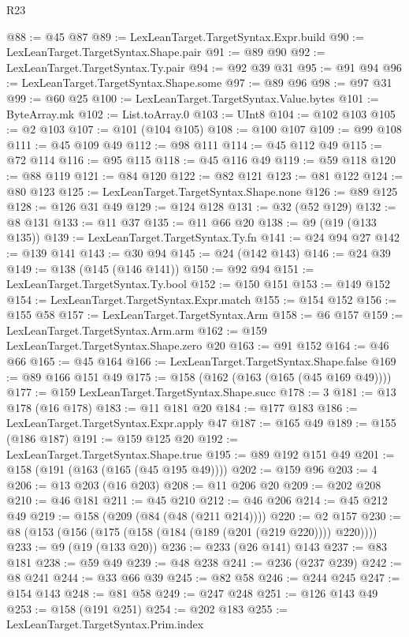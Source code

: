 \begin{lexlean}{R23}
\begin{coremodule}
@88 := @45 @87
@89 := LexLeanTarget.TargetSyntax.Expr.build
@90 := LexLeanTarget.TargetSyntax.Shape.pair
@91 := @89 @90
@92 := LexLeanTarget.TargetSyntax.Ty.pair
@94 := @92 @39 @31
@95 := @91 @94
@96 := LexLeanTarget.TargetSyntax.Shape.some
@97 := @89 @96
@98 := @97 @31
@99 := @60 @25
@100 := LexLeanTarget.TargetSyntax.Value.bytes
@101 := ByteArray.mk
@102 := List.toArray.{0}
@103 := UInt8
@104 := @102 @103
@105 := @2 @103
@107 := @101 (@104 @105)
@108 := @100 @107
@109 := @99 @108
@111 := @45 @109 @49
@112 := @98 @111
@114 := @45 @112 @49
@115 := @72 @114
@116 := @95 @115
@118 := @45 @116 @49
@119 := @59 @118
@120 := @88 @119
@121 := @84 @120
@122 := @82 @121
@123 := @81 @122
@124 := @80 @123
@125 := LexLeanTarget.TargetSyntax.Shape.none
@126 := @89 @125
@128 := @126 @31 @49
@129 := @124 @128
@131 := @32 (@52 @129)
@132 := @8 @131
@133 := @11 @37
@135 := @11 @66 @20
@138 := @9 (@19 (@133 @135))
@139 := LexLeanTarget.TargetSyntax.Ty.fn
@141 := @24 @94 @27
@142 := @139 @141
@143 := @30 @94
@145 := @24 (@142 @143)
@146 := @24 @39
@149 := @138 (@145 (@146 @141))
@150 := @92 @94
@151 := LexLeanTarget.TargetSyntax.Ty.bool
@152 := @150 @151
@153 := @149 @152
@154 := LexLeanTarget.TargetSyntax.Expr.match
@155 := @154 @152
@156 := @155 @58
@157 := LexLeanTarget.TargetSyntax.Arm
@158 := @6 @157
@159 := LexLeanTarget.TargetSyntax.Arm.arm
@162 := @159 LexLeanTarget.TargetSyntax.Shape.zero @20
@163 := @91 @152
@164 := @46 @66
@165 := @45 @164
@166 := LexLeanTarget.TargetSyntax.Shape.false
@169 := @89 @166 @151 @49
@175 := @158 (@162 (@163 (@165 (@45 @169 @49))))
@177 := @159 LexLeanTarget.TargetSyntax.Shape.succ
@178 := 3
@181 := @13 @178 (@16 @178)
@183 := @11 @181 @20
@184 := @177 @183
@186 := LexLeanTarget.TargetSyntax.Expr.apply @47
@187 := @165 @49
@189 := @155 (@186 @187)
@191 := @159 @125 @20
@192 := LexLeanTarget.TargetSyntax.Shape.true
@195 := @89 @192 @151 @49
@201 := @158 (@191 (@163 (@165 (@45 @195 @49))))
@202 := @159 @96
@203 := 4
@206 := @13 @203 (@16 @203)
@208 := @11 @206 @20
@209 := @202 @208
@210 := @46 @181
@211 := @45 @210
@212 := @46 @206
@214 := @45 @212 @49
@219 := @158 (@209 (@84 (@48 (@211 @214))))
@220 := @2 @157
@230 := @8 (@153 (@156 (@175 (@158 (@184 (@189 (@201 (@219 @220)))) @220))))
@233 := @9 (@19 (@133 @20))
@236 := @233 (@26 @141) @143
@237 := @83 @181
@238 := @59 @49
@239 := @48 @238
@241 := @236 (@237 @239)
@242 := @8 @241
@244 := @33 @66 @39
@245 := @82 @58
@246 := @244 @245
@247 := @154 @143
@248 := @81 @58
@249 := @247 @248
@251 := @126 @143 @49
@253 := @158 (@191 @251)
@254 := @202 @183
@255 := LexLeanTarget.TargetSyntax.Prim.index

\end{coremodule}
\end{lexlean}
